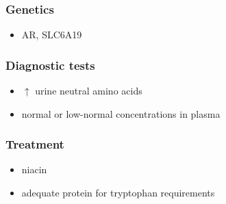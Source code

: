 \documentclass{scrartcl}
\begin{document}
\subsubsection{Genetics}
\label{sec:org8467d94}
\begin{itemize}
\item AR, SLC6A19
\end{itemize}

\subsubsection{Diagnostic tests}
\label{sec:org5ea6c45}
\begin{itemize}
\item \(\uparrow\) urine neutral amino acids
\item normal or low-normal concentrations in plasma
\end{itemize}

\subsubsection{Treatment}
\label{sec:org9c91d74}
\begin{itemize}
\item niacin
\item adequate protein for tryptophan requirements
\end{itemize}
\end{document}
